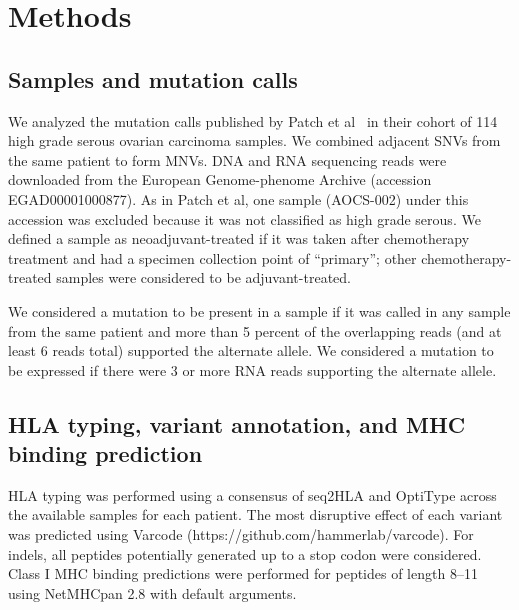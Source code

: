 \section*{Methods}

\subsection*{Samples and mutation calls}
We analyzed the mutation calls published by Patch et al~\cite{Patch_2015} in their cohort of 114 high grade serous ovarian carcinoma samples. We combined adjacent SNVs from the same patient to form MNVs. DNA and RNA sequencing reads were downloaded from the European Genome-phenome Archive (accession EGAD00001000877). As in Patch et al, one sample (AOCS-002) under this accession was excluded because it was not classified as high grade serous. We defined a sample as neoadjuvant-treated if it was taken after chemotherapy treatment and had a specimen collection point of ``primary''; other chemotherapy-treated samples were considered to be adjuvant-treated.

We considered a mutation to be present in a sample if it was called in any sample from the same patient and more than 5 percent of the overlapping reads (and at least 6 reads total) supported the alternate allele. We considered a mutation to be expressed if there were 3 or more RNA reads supporting the alternate allele.


\subsection*{HLA typing, variant annotation, and MHC binding prediction}
HLA typing was performed using a consensus of seq2HLA\cite{Boegel_2012} and OptiType\cite{Szolek_2014} across the available samples for each patient. The most disruptive effect of each variant was predicted using Varcode (https://github.com/hammerlab/varcode). For indels, all peptides potentially generated up to a stop codon were considered. Class I MHC binding predictions were performed for peptides of length 8--11 using NetMHCpan 2.8\cite{Lundegaard_2008} with default arguments.

